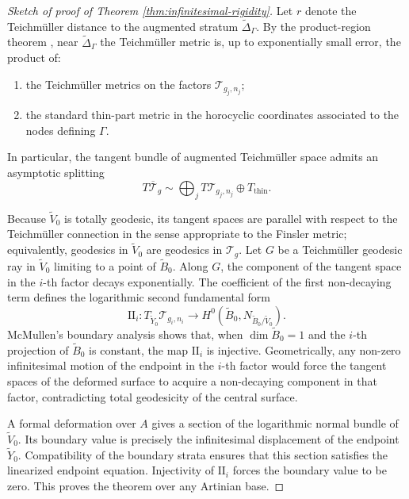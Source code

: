 \documentclass[11pt]{article}
\theoremstyle{plain}
\theoremstyle{definition}
\newcommand{\T}{\mathcal T}
\newcommand{\bT}{\overline{\T}}
\begin{document}
\begin{proof}[Sketch of proof of Theorem \ref{thm:infinitesimal-rigidity}]
Let \(r\) denote the Teichm\"uller distance to the augmented stratum \(\widetilde\Delta_{\Gamma}\).  By the product-region theorem \cite{Minsky}, near \(\widetilde\Delta_{\Gamma}\) the Teichm\"uller metric is, up to exponentially small error, the product of:
\begin{enumerate}[label=(\alph*)]
\item the Teichm\"uller metrics on the factors \(\T_{g_{j},n_{j}}\);
\item the standard thin-part metric in the horocyclic coordinates associated to the nodes defining \(\Gamma\).
\end{enumerate}
In particular, the tangent bundle of augmented Teichm\"uller space admits an asymptotic splitting
\[
T\bT_{g}\sim \bigoplus_{j} T\T_{g_{j},n_{j}}\oplus T_{\mathrm{thin}}.
\]

Because \(\widetilde V_{0}\) is totally geodesic, its tangent spaces are parallel with respect to the Teichm\"uller connection in the sense appropriate to the Finsler metric; equivalently, geodesics in \(\widetilde V_{0}\) are geodesics in \(\T_{g}\).  Let \(G\) be a Teichm\"uller geodesic ray in \(\widetilde V_{0}\) limiting to a point of \(\widetilde B_{0}\).  Along \(G\), the component of the tangent space in the \(i\)-th factor decays exponentially.  The coefficient of the first non-decaying term defines the logarithmic second fundamental form
\[
\mathrm{II}_{i}:T_{\widetilde Y_{0}}\T_{g_{i},n_{i}}\longrightarrow H^{0}(\widetilde B_{0},N_{\widetilde B_{0}/\widetilde V_{0}}).
\]
McMullen's boundary analysis \cite{McMullen} shows that, when \(\dim \widetilde B_{0}=1\) and the \(i\)-th projection of \(\widetilde B_{0}\) is constant, the map \(\mathrm{II}_{i}\) is injective.  Geometrically, any non-zero infinitesimal motion of the endpoint in the \(i\)-th factor would force the tangent spaces of the deformed surface to acquire a non-decaying component in that factor, contradicting total geodesicity of the central surface.

A formal deformation over \(A\) gives a section of the logarithmic normal bundle of \(\widetilde V_{0}\).  Its boundary value is precisely the infinitesimal displacement of the endpoint \(\widetilde Y_{0}\).  Compatibility of the boundary strata ensures that this section satisfies the linearized endpoint equation.  Injectivity of \(\mathrm{II}_{i}\) forces the boundary value to be zero.  This proves the theorem over any Artinian base.
\end{proof}
\end{document}
